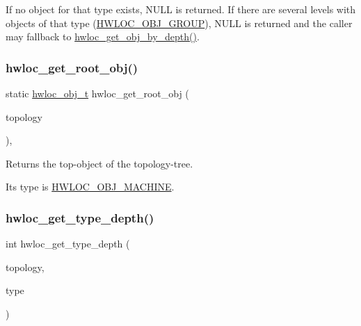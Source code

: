 If no object for that type exists, {\ttfamily N\+U\+LL} is returned. If there are several levels with objects of that type (\hyperlink{a00184_ggacd37bb612667dc437d66bfb175a8dc55a5269ef95be72f88465559d35c9b7ad56}{H\+W\+L\+O\+C\+\_\+\+O\+B\+J\+\_\+\+G\+R\+O\+UP}), {\ttfamily N\+U\+LL} is returned and the caller may fallback to \hyperlink{a00187_ga391f6b2613f0065673eaa4069b93d4e0}{hwloc\+\_\+get\+\_\+obj\+\_\+by\+\_\+depth()}. \mbox{\label{a00187_ga2d4b12fc187dfc53b35f2fa21d21044d}} 
\subsubsection{\texorpdfstring{hwloc\+\_\+get\+\_\+root\+\_\+obj()}{hwloc\_get\_root\_obj()}}
{\footnotesize\ttfamily static \hyperlink{a00185_ga79b8ab56877ef99ac59b833203391c7d}{hwloc\+\_\+obj\+\_\+t} hwloc\+\_\+get\+\_\+root\+\_\+obj (\begin{DoxyParamCaption}\item[{\hyperlink{a00186_ga9d1e76ee15a7dee158b786c30b6a6e38}{hwloc\+\_\+topology\+\_\+t}}]{topology }\end{DoxyParamCaption})\hspace{0.3cm}{\ttfamily [inline]}, {\ttfamily [static]}}



Returns the top-\/object of the topology-\/tree. 

Its type is \hyperlink{a00184_ggacd37bb612667dc437d66bfb175a8dc55a3f4e83ffc4a259354959ae8a9eaa2a80}{H\+W\+L\+O\+C\+\_\+\+O\+B\+J\+\_\+\+M\+A\+C\+H\+I\+NE}. \mbox{\label{a00187_ga8bec782e21be313750da70cf7428b374}} 
\subsubsection{\texorpdfstring{hwloc\+\_\+get\+\_\+type\+\_\+depth()}{hwloc\_get\_type\_depth()}}
{\footnotesize\ttfamily int hwloc\+\_\+get\+\_\+type\+\_\+depth (\begin{DoxyParamCaption}\item[{\hyperlink{a00186_ga9d1e76ee15a7dee158b786c30b6a6e38}{hwloc\+\_\+topology\+\_\+t}}]{topology,  }\item[{\hyperlink{a00184_gacd37bb612667dc437d66bfb175a8dc55}{hwloc\+\_\+obj\+\_\+type\+\_\+t}}]{type }\end{DoxyParamCaption})}



